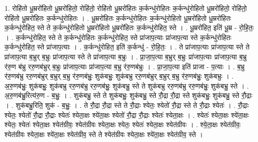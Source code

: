 \documentclass[17pt]{extarticle}
\begin{document}
1. रोहि॑तो धू॒म्ररो॑हितो धू॒म्ररो॑हितो॒ रोहि॑तो॒ रोहि॑तो धू॒म्ररो॑हितः क॒र्कन्धु॑रोहितः क॒र्कन्धु॑रोहितो धू॒म्ररो॑हितो॒ रोहि॑तो॒ रोहि॑तो धू॒म्ररो॑हितः क॒र्कन्धु॑रोहितः । . धू॒म्ररो॑हितः क॒र्कन्धु॑रोहितः क॒र्कन्धु॑रोहितो धू॒म्ररो॑हितो धू॒म्ररो॑हितः क॒र्कन्धु॑रोहित॒ स्ते ते क॒र्कन्धु॑रोहितो धू॒म्ररो॑हितो धू॒म्ररो॑हितः क॒र्कन्धु॑रोहित॒ स्ते । . धू॒म्ररो॑हित॒ इति॑ धू॒म्र - रो॒हि॒तः॒ । . क॒र्कन्धु॑रोहित॒ स्ते ते क॒र्कन्धु॑रोहितः क॒र्कन्धु॑रोहित॒ स्ते प्रा॑जाप॒त्याः प्रा॑जाप॒त्या स्ते क॒र्कन्धु॑रोहितः क॒र्कन्धु॑रोहित॒ स्ते प्रा॑जाप॒त्याः । . क॒र्कन्धु॑रोहित॒ इति॑ क॒र्कन्धु॑ - रो॒हि॒तः॒ । . ते प्रा॑जाप॒त्याः प्रा॑जाप॒त्या स्ते ते प्रा॑जाप॒त्या ब॒भ्रुर् ब॒भ्रुः प्रा॑जाप॒त्या स्ते ते प्रा॑जाप॒त्या ब॒भ्रुः । . प्रा॒जा॒प॒त्या ब॒भ्रुर् ब॒भ्रुः प्रा॑जाप॒त्याः प्रा॑जाप॒त्या ब॒भ्रु र॑रु॒ण ब॑भ्रु ररु॒णब॑भ्रुर् ब॒भ्रुः प्रा॑जाप॒त्याः प्रा॑जाप॒त्या ब॒भ्रु र॑रु॒णब॑भ्रुः । . प्रा॒जा॒प॒त्या इति॑ प्राजा - प॒त्याः । . ब॒भ्रु र॑रु॒णब॑भ्रु ररु॒णब॑भ्रुर् ब॒भ्रुर् ब॒भ्रु र॑रु॒णब॑भ्रुः॒ शुक॑बभ्रुः॒ शुक॑बभ्रु ररु॒णब॑भ्रुर् ब॒भ्रुर् ब॒भ्रु र॑रु॒णब॑भ्रुः॒ शुक॑बभ्रुः । . अ॒रु॒णब॑भ्रुः॒ शुक॑बभ्रुः॒ शुक॑बभ्रु ररु॒णब॑भ्रु ररु॒णब॑भ्रुः॒ शुक॑बभ्रु॒ स्ते ते शुक॑बभ्रु ररु॒णब॑भ्रु ररु॒णब॑भ्रुः॒ शुक॑बभ्रु॒ स्ते । . अ॒रु॒णब॑भ्रु॒रित्य॑रु॒ण - ब॒भ्रुः॒ । . शुक॑बभ्रु॒ स्ते ते शुक॑बभ्रुः॒ शुक॑बभ्रु॒ स्ते रौ॒द्रा रौ॒द्रा स्ते शुक॑बभ्रुः॒ शुक॑बभ्रु॒ स्ते रौ॒द्राः । . शुक॑बभ्रु॒रिति॒ शुक॑ - ब॒भ्रुः॒ । . ते रौ॒द्रा रौ॒द्रा स्ते ते रौ॒द्राः श्येतः॒ श्येतो॑ रौ॒द्रा स्ते ते रौ॒द्राः श्येतः॑ । . रौ॒द्राः श्येतः॒ श्येतो॑ रौ॒द्रा रौ॒द्राः श्येतः॑ श्येता॒क्षः श्ये॑ता॒क्षः श्येतो॑ रौ॒द्रा रौ॒द्राः श्येतः॑ श्येता॒क्षः । . श्येतः॑ श्येता॒क्षः श्ये॑ता॒क्षः श्येतः॒ श्येतः॑ श्येता॒क्षः श्येत॑ग्रीवः॒ श्येत॑ग्रीवः श्येता॒क्षः श्येतः॒ श्येतः॑ श्येता॒क्षः श्येत॑ग्रीवः । . श्ये॒ता॒क्षः श्येत॑ग्रीवः॒ श्येत॑ग्रीवः श्येता॒क्षः श्ये॑ता॒क्षः श्येत॑ग्रीव॒ स्ते ते श्येत॑ग्रीवः श्येता॒क्षः श्ये॑ता॒क्षः श्येत॑ग्रीव॒ स्ते । \newline
\end{document}
